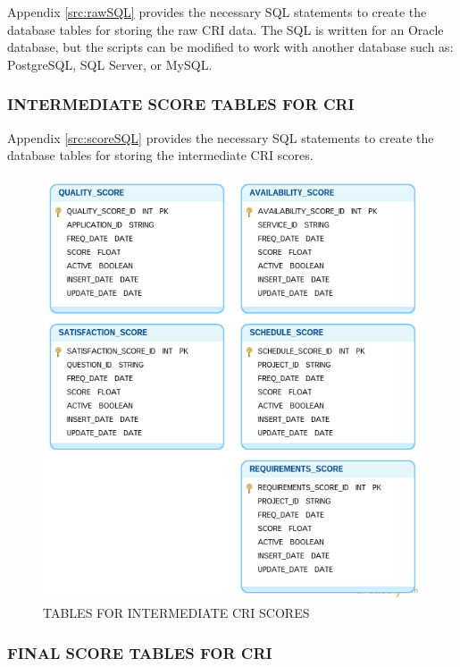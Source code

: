 \documentclass[SDSUThesis.tex]{subfiles}
\begin{document}
        Appendix \ref{src:rawSQL} provides the necessary SQL statements to create the 
        database tables for storing the raw CRI data.  The SQL is written for an Oracle
        database, but the scripts can be modified to work with another database
        such as: PostgreSQL, SQL Server, or MySQL.  
        
    \subsubsection{INTERMEDIATE SCORE TABLES FOR CRI}
    
        Appendix \ref{src:scoreSQL} provides the necessary SQL statements to create the 
        database tables for storing the intermediate CRI scores.
        
       \begin{figure}[ht]
            \centering
            \includegraphics[scale=.55]{images/score_tables.png}
            \caption{TABLES FOR INTERMEDIATE CRI SCORES}
            \label{fig:score_tables}
        \end{figure}%
    
    \subsubsection{FINAL SCORE TABLES FOR CRI}
    
\end{document}
